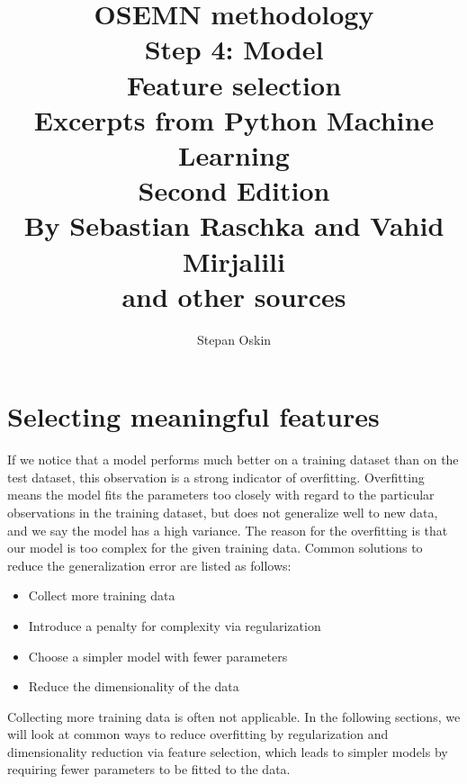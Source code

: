 \documentclass[11pt]{article}
\begin{document}
    \title{OSEMN methodology \\
    Step 4: Model \\
    Feature selection \\
    Excerpts from Python Machine Learning \\
    Second Edition \\
    By Sebastian Raschka and Vahid Mirjalili\cite{RaschkaMirjalili2017} \\
    and other sources}

    \author{Stepan Oskin}

    \maketitle

    \begin{abstract}

    \end{abstract}

    \section{Selecting meaningful features} \label{sec:selecting_meaningful_features}

    If we notice that a model performs much better on a training dataset than on the test dataset, this observation is a strong indicator of overfitting.
    Overfitting means the model fits the parameters too closely with regard to the particular observations in the training dataset, but does not generalize well to new data, and we say the model has a high variance.
    The reason for the overfitting is that our model is too complex for the given training data.
    Common solutions to reduce the generalization error are listed as follows:

    \begin{itemize}
        \item Collect more training data
        \item Introduce a penalty for complexity via regularization
        \item Choose a simpler model with fewer parameters
        \item Reduce the dimensionality of the data
    \end{itemize}

    Collecting more training data is often not applicable.
    In the following sections, we will look at common ways to reduce overfitting by regularization and dimensionality reduction via feature selection, which leads to simpler models by requiring fewer parameters to be fitted to the data.
\end{document}
